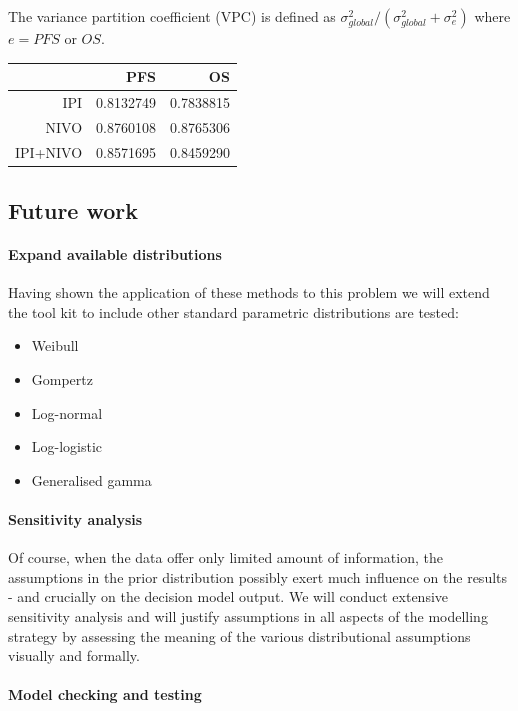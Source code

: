 \documentclass[
]{article}
\providecommand{\tightlist}{%
  \setlength{\itemsep}{0pt}\setlength{\parskip}{0pt}}
\begin{document}
The variance partition coefficient (VPC) is defined as
\(\sigma_{global}^2/ (\sigma_{global}^2 + \sigma_{e}^2)\) where
\(e = PFS\) or \(OS\).

\begin{longtable}[]{@{}rrr@{}}
\toprule
& PFS & OS\tabularnewline
\midrule
\endhead
IPI & 0.8132749 & 0.7838815\tabularnewline
NIVO & 0.8760108 & 0.8765306\tabularnewline
IPI+NIVO & 0.8571695 & 0.8459290\tabularnewline
\bottomrule
\end{longtable}

\hypertarget{future-work}{%
\subsection{Future work}\label{future-work}}

\hypertarget{expand-available-distributions}{%
\paragraph{Expand available
distributions}\label{expand-available-distributions}}

Having shown the application of these methods to this problem we will
extend the tool kit to include other standard parametric distributions
are tested:

\begin{itemize}
\tightlist
\item
  Weibull
\item
  Gompertz
\item
  Log-normal
\item
  Log-logistic
\item
  Generalised gamma
\end{itemize}

\hypertarget{sensitivity-analysis}{%
\paragraph{Sensitivity analysis}\label{sensitivity-analysis}}

Of course, when the data offer only limited amount of information, the
assumptions in the prior distribution possibly exert much influence on
the results - and crucially on the decision model output. We will
conduct extensive sensitivity analysis and will justify assumptions in
all aspects of the modelling strategy by assessing the meaning of the
various distributional assumptions visually and formally.

\hypertarget{model-checking-and-testing}{%
\paragraph{Model checking and
testing}\label{model-checking-and-testing}}
\end{document}
